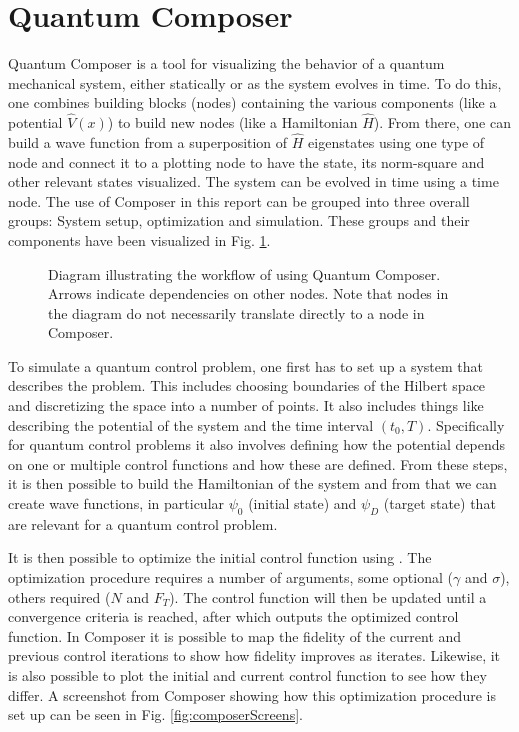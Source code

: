 \documentclass[a4paper, twocolumn]{revtex4-1}
\begin{document}
\section{Quantum Composer}\label{sec:Composer}
Quantum Composer is a tool for visualizing the behavior of a quantum mechanical system, either statically or as the system evolves in time. To do this, one combines building blocks (nodes) containing the various components (like a potential $\hat{V}(x)$) to build new nodes (like a Hamiltonian $\hat{H}$). From there, one can build a wave function from a superposition of $\hat{H}$ eigenstates using one type of node and connect it to a plotting node to have the state, its norm-square and other relevant states visualized. The system can be evolved in time using a time node. The use of Composer in this report can be grouped into three overall groups: System setup,  optimization and simulation. These groups and their components have been visualized in Fig. \ref{fig:flowdiagram}. 

\begin{figure}
\def\svgwidth{\textwidth}
	
	\caption{Diagram illustrating the workflow of using Quantum Composer. Arrows indicate dependencies on other nodes. Note that nodes in the diagram do not necessarily translate directly to a node in Composer.}
	\label{fig:flowdiagram}
\end{figure}

To simulate a quantum control problem, one first has to set up a system that describes the problem. This includes choosing boundaries of the Hilbert space and discretizing the space into a number of points. It also includes things like describing the potential of the system and the time interval $(t_0, T)$. Specifically for quantum control problems it also involves defining how the potential depends on one or multiple control functions and how these are defined. From these steps, it is then possible to build the Hamiltonian of the system and from that we can create wave functions, in particular $\psi_0$ (initial state) and $\psi_D$ (target state) that are relevant for a quantum control problem.


It is then possible to optimize the initial control function using . The optimization procedure requires a number of arguments, some optional ($\gamma$ and $\sigma$), others required ($N$ and $F_T$). The control function will then be updated until a convergence criteria is reached, after which  outputs the optimized control function. In Composer it is possible to map the fidelity of the current and previous control iterations to show how fidelity improves as  iterates. Likewise, it is also possible to plot the initial and current control function to see how they differ. A screenshot from Composer showing how this optimization procedure is set up can be seen in Fig. \ref{fig:composerScreens}.
\end{document}
